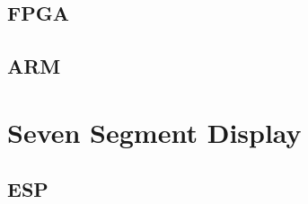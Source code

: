 \documentclass[journal]{IEEEtran}
\begin{document}
\subsection{FPGA}

\subsection{ARM}


\section{Seven Segment Display}
\subsection{ESP}

%
%

\end{document}
